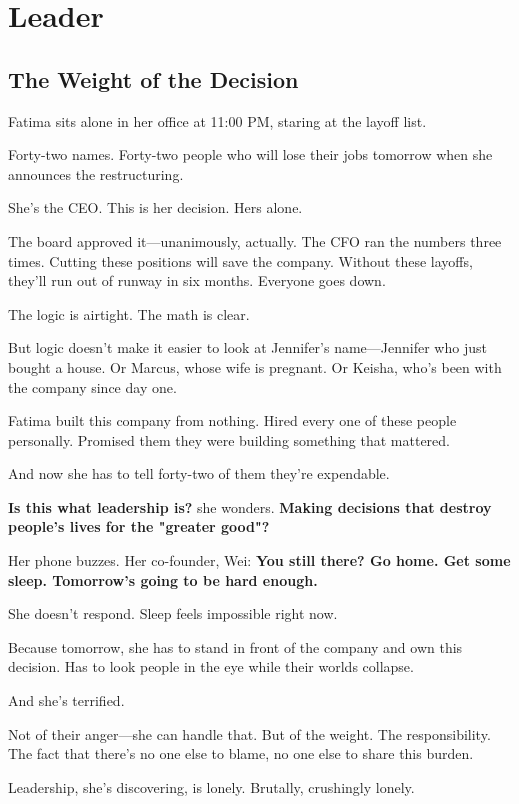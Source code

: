 \documentclass[11pt,twoside]{book}
\begin{document}
\chapter{Leader}

\section*{The Weight of the Decision}

Fatima sits alone in her office at 11:00 PM, staring at the layoff list.

Forty-two names. Forty-two people who will lose their jobs tomorrow when she announces the restructuring.

She's the CEO. This is her decision. Hers alone.

The board approved it—unanimously, actually. The CFO ran the numbers three times. Cutting these positions will save the company. Without these layoffs, they'll run out of runway in six months. Everyone goes down.

The logic is airtight. The math is clear.

But logic doesn't make it easier to look at Jennifer's name—Jennifer who just bought a house. Or Marcus, whose wife is pregnant. Or Keisha, who's been with the company since day one.

Fatima built this company from nothing. Hired every one of these people personally. Promised them they were building something that mattered.

And now she has to tell forty-two of them they're expendable.

\textbf{Is this what leadership is?} she wonders. \textbf{Making decisions that destroy people's lives for the "greater good"?}

Her phone buzzes. Her co-founder, Wei: \textbf{You still there? Go home. Get some sleep. Tomorrow's going to be hard enough.}

She doesn't respond. Sleep feels impossible right now.

Because tomorrow, she has to stand in front of the company and own this decision. Has to look people in the eye while their worlds collapse.

And she's terrified.

Not of their anger—she can handle that. But of the weight. The responsibility. The fact that there's no one else to blame, no one else to share this burden.

Leadership, she's discovering, is lonely. Brutally, crushingly lonely.
\end{document}
